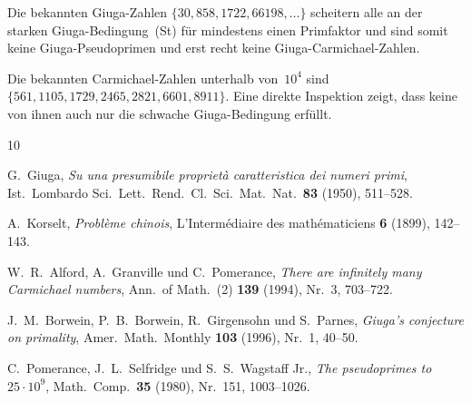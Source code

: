 \documentclass[12pt,a4paper]{amsart}
\theoremstyle{definition}
\begin{document}
Die bekannten Giuga-Zahlen $\{30, 858, 1722, 66198, \ldots\}$ scheitern alle an der
starken Giuga-Bedingung~(St) für mindestens einen Primfaktor und sind somit keine
Giuga-Pseudoprimen und erst recht keine Giuga-Carmichael-Zahlen.

Die bekannten Carmichael-Zahlen unterhalb von~$10^4$ sind $\{561, 1105, 1729, 2465, 2821,
6601, 8911\}$. Eine direkte Inspektion zeigt, dass keine von ihnen auch nur die schwache
Giuga-Bedingung erfüllt.

\begin{thebibliography}{10}

G.~Giuga,
\emph{Su una presumibile propriet\`a caratteristica dei numeri primi},
Ist.\ Lombardo Sci.\ Lett.\ Rend.\ Cl.\ Sci.\ Mat.\ Nat.\ \textbf{83}
(1950), 511--528.

A.~Korselt,
\emph{Probl\`eme chinois},
L'Interm\'ediaire des math\'ematiciens \textbf{6} (1899), 142--143.

W.~R.~Alford, A.~Granville und C.~Pomerance,
\emph{There are infinitely many Carmichael numbers},
Ann.\ of Math.\ (2) \textbf{139} (1994), Nr.\ 3, 703--722.

J.~M.~Borwein, P.~B.~Borwein, R.~Girgensohn und S.~Parnes,
\emph{Giuga's conjecture on primality},
Amer.\ Math.\ Monthly \textbf{103} (1996), Nr.\ 1, 40--50.

C.~Pomerance, J.~L.~Selfridge und S.~S.~Wagstaff Jr.,
\emph{The pseudoprimes to $25 \cdot 10^9$},
Math.\ Comp.\ \textbf{35} (1980), Nr.\ 151, 1003--1026.

\end{thebibliography}
\end{document}
